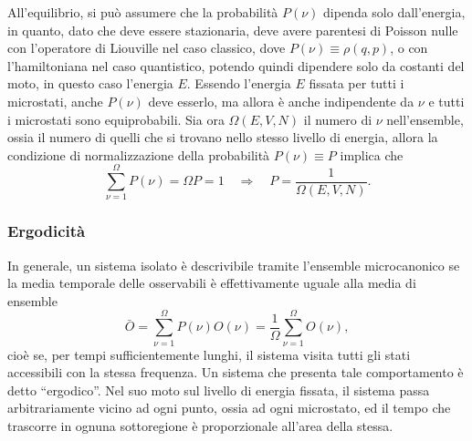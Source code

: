 All'equilibrio, si può assumere che la probabilità $P(\nu)$ dipenda solo dall'energia, in quanto, dato che deve essere stazionaria, deve avere parentesi di Poisson nulle con l'operatore di Liouville nel caso classico, dove $P(\nu) \equiv \rho(q,p)$, o con l'hamiltoniana nel caso quantistico, potendo quindi dipendere solo da costanti del moto, in questo caso l'energia $E$. Essendo l'energia $E$ fissata per tutti i microstati, anche $P(\nu)$ deve esserlo, ma allora è anche indipendente da $\nu$ e tutti i microstati sono equiprobabili. Sia ora $\Omega(E,V,N)$ il numero di $\nu$ nell'ensemble, ossia il numero di quelli che si trovano nello stesso livello di energia, allora la condizione di normalizzazione della probabilità $P(\nu) \equiv P$ implica che 
\begin{equation}
\label{eq: probabilità microstati (microcanonico)}
    \sum_{\nu = 1}^\Omega P(\nu) = \Omega P = 1\quad\Rightarrow\quad P = \frac{1}{\Omega(E,V,N)}.
\end{equation}

\subsubsection{Ergodicità}
In generale, un sistema isolato è descrivibile tramite l'ensemble microcanonico se la media temporale delle osservabili è effettivamente uguale alla media di ensemble 
\begin{equation}
\label{eq: media ensemble microcanonico}
    \bar{O} = \sum_{\nu = 1}^\Omega P(\nu)O(\nu) = \frac{1}{\Omega}\sum_{\nu = 1}^\Omega O(\nu),
\end{equation}
cioè se, per tempi sufficientemente lunghi, il sistema visita tutti gli stati accessibili con la stessa frequenza. Un sistema che presenta tale comportamento è detto ``ergodico''. Nel suo moto sul livello di energia fissata, il sistema passa arbitrariamente vicino ad ogni punto, ossia ad ogni microstato, ed il tempo che trascorre in ognuna sottoregione è proporzionale all'area della stessa. 

